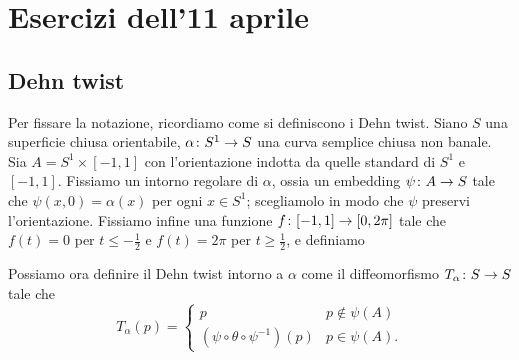 \section*{Esercizi dell'11 aprile}


\subsection*{Dehn twist}
Per fissare la notazione, ricordiamo come si definiscono i Dehn twist. Siano $S$ una superficie chiusa orientabile, $\map{\alpha}{S^1}{S}$ una curva semplice chiusa non banale. Sia $A=S^1\times[-1,1]$ con l'orientazione indotta da quelle standard di $S^1$ e $[-1,1]$. Fissiamo un intorno regolare di $\alpha$, ossia un embedding $\map{\psi}{A}{S}$ tale che $\psi(x,0)=\alpha(x)$ per ogni $x\in S^1$; scegliamolo in modo che $\psi$ preservi l'orientazione. Fissiamo infine una funzione $\map{f}{[-1,1]}{[0,2\pi]}$ tale che
$f(t)=0$ per $t\le-\frac{1}{2}$ e $f(t)=2\pi$ per $t\ge\frac{1}{2}$, e definiamo
\begin{center}
\end{center}
Possiamo ora definire il Dehn twist intorno a $\alpha$ come il diffeomorfismo $\map{T_\alpha}{S}{S}$ tale che
\[
T_\alpha(p)=\begin{cases}
p&p\not\in\psi(A)\\
(\psi\circ\theta\circ\psi^{-1})(p)&p\in\psi(A).
\end{cases}
\]

